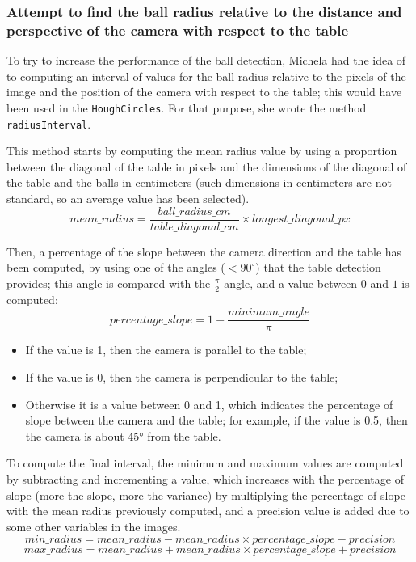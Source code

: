 \subsubsection{Attempt to find the ball radius relative to the distance and perspective of the camera with respect to the table}
To try to increase the performance of the ball detection, Michela had the idea of to computing an interval of values for the ball radius relative to the pixels of the image and the position of the camera with respect to the table; this would have been used in the \texttt{HoughCircles}.
For that purpose, she wrote the method \texttt{radiusInterval}.

This method starts by computing the mean radius value by using a proportion between the diagonal of the table in pixels and the dimensions of the diagonal of the table and the balls in centimeters (such dimensions in centimeters are not standard, so an average value has been selected).
\begin{equation}
	mean\_radius = \frac{ball\_radius\_cm}{table\_diagonal\_cm} \times longest\_diagonal\_px
\end{equation}

Then, a percentage of the slope between the camera direction and the table has been computed, by using one of the angles ($<90^{\circ}$) that the table detection provides; this angle is compared with the $\frac{\pi}{2}$ angle, and a value between $0$ and $1$ is computed:
\begin{equation}
	percentage\_slope = 1 - \frac{minimum\_angle}{\pi}
\end{equation}

\begin{itemize}
	\item If the value is 1, then the camera is parallel to the table;
	\item If the value is 0, then the camera is perpendicular to the table;
	\item Otherwise it is a value between 0 and 1, which indicates the percentage of slope between the camera and the table; for example, if the value is 0.5, then the camera is about 45° from the table.
\end{itemize}

To compute the final interval, the minimum and maximum values are computed by subtracting and incrementing a value, which increases with the percentage of slope (more the slope, more the variance) by multiplying the percentage of slope with the mean radius previously computed, and a precision value is added due to some other variables in the images.
\begin{equation}
	min\_radius = mean\_radius - mean\_radius \times percentage\_slope - precision
\end{equation}
\begin{equation}
	max\_radius = mean\_radius + mean\_radius \times percentage\_slope + precision
\end{equation}

